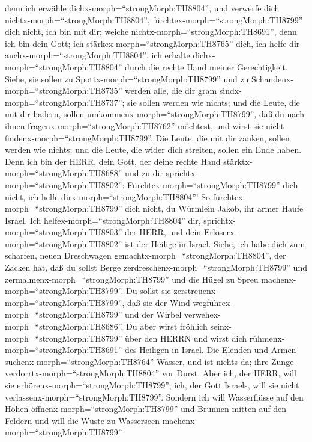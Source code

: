 denn ich erwähle dichx-morph=``strongMorph:TH8804'', und verwerfe dich
nichtx-morph=``strongMorph:TH8804'', 
fürchtex-morph=``strongMorph:TH8799'' dich nicht, ich bin mit dir;
weiche nichtx-morph=``strongMorph:TH8691'', denn ich bin dein Gott; ich
stärkex-morph=``strongMorph:TH8765'' dich, ich helfe dir
auchx-morph=``strongMorph:TH8804'', ich erhalte
dichx-morph=``strongMorph:TH8804'' durch die rechte Hand meiner
Gerechtigkeit.  Siehe, sie sollen zu
Spottx-morph=``strongMorph:TH8799'' und zu
Schandenx-morph=``strongMorph:TH8735'' werden alle, die dir gram
sindx-morph=``strongMorph:TH8737''; sie sollen werden wie nichts; und
die Leute, die mit dir hadern, sollen
umkommenx-morph=``strongMorph:TH8799'',  daß du nach ihnen
fragenx-morph=``strongMorph:TH8762'' möchtest, und wirst sie nicht
findenx-morph=``strongMorph:TH8799''. Die Leute, die mit dir zanken,
sollen werden wie nichts; und die Leute, die wider dich streiten, sollen
ein Ende haben.  Denn ich bin der HERR, dein Gott, der
deine rechte Hand stärktx-morph=``strongMorph:TH8688'' und zu dir
sprichtx-morph=``strongMorph:TH8802'':
Fürchtex-morph=``strongMorph:TH8799'' dich nicht, ich helfe
dirx-morph=``strongMorph:TH8804''!  So
fürchtex-morph=``strongMorph:TH8799'' dich nicht, du Würmlein Jakob, ihr
armer Haufe Israel. Ich helfex-morph=``strongMorph:TH8804'' dir,
sprichtx-morph=``strongMorph:TH8803'' der HERR, und dein
Erlöserx-morph=``strongMorph:TH8802'' ist der Heilige in Israel.
 Siehe, ich habe dich zum scharfen, neuen Dreschwagen
gemachtx-morph=``strongMorph:TH8804'', der Zacken hat, daß du sollst
Berge zerdreschenx-morph=``strongMorph:TH8799'' und
zermalmenx-morph=``strongMorph:TH8799'' und die Hügel zu Spreu
machenx-morph=``strongMorph:TH8799''.  Du sollst sie
zerstreuenx-morph=``strongMorph:TH8799'', daß sie der Wind
wegführex-morph=``strongMorph:TH8799'' und der Wirbel
verwehex-morph=``strongMorph:TH8686''. Du aber wirst fröhlich
seinx-morph=``strongMorph:TH8799'' über den HERRN und wirst dich
rühmenx-morph=``strongMorph:TH8691'' des Heiligen in Israel.
 Die Elenden und Armen suchenx-morph=``strongMorph:TH8764''
Wasser, und ist nichts da; ihre Zunge
verdorrtx-morph=``strongMorph:TH8804'' vor Durst. Aber ich, der HERR,
will sie erhörenx-morph=``strongMorph:TH8799''; ich, der Gott Israels,
will sie nicht verlassenx-morph=``strongMorph:TH8799''. 
Sondern ich will Wasserflüsse auf den Höhen
öffnenx-morph=``strongMorph:TH8799'' und Brunnen mitten auf den Feldern
und will die Wüste zu Wasserseen machenx-morph=``strongMorph:TH8799''
